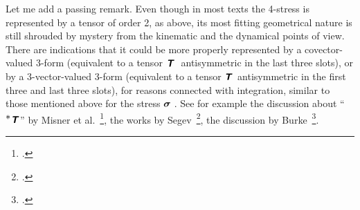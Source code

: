 \documentclass[\ifafour a4paper,12pt,\else a5paper,10pt,\fi%
onecolumn,oneside,article,%
british%
]{memoir}
\makeatletter
\newcommand*{\defquote}[1]{`\,#1\,'}
\theoremstyle{remark}
\theoremstyle{innote}
\newcommand*{\mathte}[1]{\textbf{\textit{\textsf{#1}}}}
\newcommand*{\citep}{\footcites}
\newcommand*{\amp}{\&}
\newcommand*{\de}{\partialup}%
\newcommand*{\di}{\mathrm{d}}%
\DeclareMathOperator{\tr}{tr}%
\renewcommand*{\|}[1][]{\nonscript\,#1\vert\nonscript\;\mathopen{}}
\newcommand*{\sect}{\S}%
\newcommand*{\chap}{ch.}%
\newcommand*{\etal}{{et al.}}
\newcommand*{\q}{}%
\DeclareRobustCommand*{\q}{%
  \mathbin{\mathpalette\bigcdot@{}}%
}
\newcommand*{\bigcdot@scalefactor}{0.75}
\newcommand*{\bigcdot@widthfactor}{1.5}
\newcommand*{\bigcdot@}[2]{%
  \sbox0{$#1\vcenter{}$}%
  \sbox2{$#1\cdot\m@th$}%
  \hbox to \bigcdot@widthfactor\wd2{%
    \hfil
    \raise\ht0\hbox{%
      \scalebox{\bigcdot@scalefactor}{%
        \lower\ht0\hbox{$#1\bullet\m@th$}%
      }%
    }%
    \hfil
  }%
}
\newcommand*{\yT}{\mathte{T}}
\renewcommand*{\i}{\indices}
\newcommand*{\dex}[1][i]{\frac{\de}{\de x^{#1}}}
\newcommand*{\dix}[1][i]{\di x^{#1}}
\newcommand*{\nab}{\nabla}
\newcommand*{\yt}{\bm{\sigma}}
\makeatother
\begin{document}

\medskip




Let me add a passing remark. Even though in most texts the 4-stress is
represented by a tensor of order 2, as above, its most fitting geometrical
nature is still shrouded by mystery from the kinematic and the dynamical
points of view. There are indications that it could be more properly
represented by a covector-valued 3-form (equivalent to a tensor
$\yT\i{_{\q\;\q\q\q}}$ antisymmetric in the last three slots), or by a
3-vector-valued 3-form (equivalent to a tensor $\yT\i{^{\q\q\q}_{\q\q\q}}$
antisymmetric in the first three and last three slots), for reasons
connected with integration, similar to those mentioned above for the stress
$\yt\i{_{\q\;\q\q}}$. See for example the discussion about
\enquote{$^{\displaystyle *}\mathte{T}$} by Misner
\etal~\citep[\chap~15]{misneretal1970_r1973}, the works by
Segev~\citep{segev2002,segev1986,segevetal1999,segev2000,segev2000b}, the
discussion by Burke~\citep[\sect~41]{burke1985_r1987}.





\end{document}
